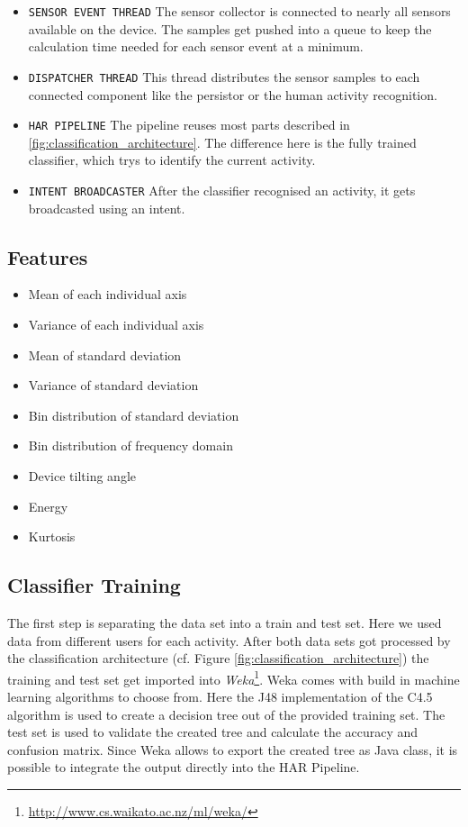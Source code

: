 \begin{itemize}
  \item \texttt{SENSOR EVENT THREAD} The sensor collector is connected to nearly
    all sensors available on the device. The samples get pushed into a queue to 
    keep the calculation time needed for each sensor event at a minimum.
  \item \texttt{DISPATCHER THREAD} This thread distributes the sensor samples to
    each connected component like the persistor or the human activity 
    recognition.
  \item \texttt{HAR PIPELINE} The pipeline reuses most parts described in 
    \ref{fig:classification_architecture}. The difference here is the fully 
    trained classifier, which trys to identify the current activity.
  \item \texttt{INTENT BROADCASTER} After the classifier recognised an activity,
    it gets broadcasted using an intent.
\end{itemize}


\subsection{Features}\label{sec:har_features}

\begin{itemize}
  \item Mean of each individual axis
  \item Variance of each individual axis
  \item Mean of standard deviation
  \item Variance of standard deviation
  \item Bin distribution of standard deviation
  \item Bin distribution of frequency domain
  \item Device tilting angle
  \item Energy
  \item Kurtosis
\end{itemize}


\subsection{Classifier Training}\label{sec:har_classifier_training}

The first step is separating the data set into a train and test set. Here we 
used data from different users for each activity. After both data sets got 
processed by the classification architecture (cf. Figure \ref{fig:classification_architecture})
the training and test set get imported into {\it Weka}\footnote{\url{http://www.cs.waikato.ac.nz/ml/weka/}}.
Weka comes with build in machine learning algorithms to choose from. Here the 
J48 implementation of the C4.5 algorithm is used to create a decision tree out 
of the provided training set. The test set is used to validate the created tree
and calculate the accuracy and confusion matrix. Since Weka allows to export 
the created tree as Java class, it is possible to integrate the output directly 
into the HAR Pipeline.

